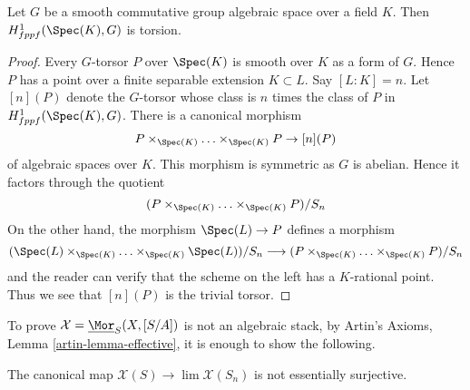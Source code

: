 \begin{lemma}
\label{lemma-torsors-over-field-torsion}
Let $G$ be a smooth commutative group algebraic space over a field $K$.
Then $H^1_{fppf}(\Spec(K), G)$ is torsion.
\end{lemma}

\begin{proof}
Every $G$-torsor $P$ over $\Spec(K)$ is smooth over $K$ as a form of $G$.
Hence $P$ has a point over a finite separable extension $K \subset L$.
Say $[L : K] = n$. Let $[n](P)$ denote the $G$-torsor whose class is $n$
times the class of $P$ in $H^1_{fppf}(\Spec(K), G)$. There is a canonical
morphism
$$
P \times_{\Spec(K)} \ldots \times_{\Spec(K)} P \to [n](P)
$$
of algebraic spaces over $K$. This morphism is symmetric as
$G$ is abelian. Hence it factors through the quotient
$$
(P \times_{\Spec(K)} \ldots \times_{\Spec(K)} P)/S_n
$$
On the other hand, the morphism $\Spec(L) \to P$ defines a morphism
$$
(\Spec(L) \times_{\Spec(K)} \ldots \times_{\Spec(K)} \Spec(L))/S_n
\longrightarrow (P \times_{\Spec(K)} \ldots \times_{\Spec(K)} P)/S_n
$$
and the reader can verify that the scheme on the left has a $K$-rational
point. Thus we see that $[n](P)$ is the trivial torsor.
\end{proof}

\noindent
To prove $\mathcal{X} = \underline{\Mor}_S(X, [S/A])$
is not an algebraic stack, by
Artin's Axioms, Lemma \ref{artin-lemma-effective},
it is enough to show the following.

\begin{lemma}
\label{lemma-not-essentially-surjective}
The canonical map $\mathcal{X}(S) \to \lim \mathcal{X}(S_n)$
is not essentially surjective.
\end{lemma}

